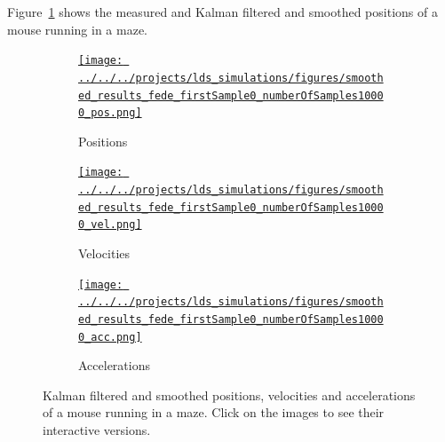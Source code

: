 \documentclass[12pt]{article}
\begin{document}
Figure~\ref{fig:runningMaze} shows the measured and Kalman filtered and smoothed
positions of a mouse running in a maze.

\begin{figure}
    \begin{center}

        \begin{subfigure}{\textwidth}
            \centering
            \href{http://www.gatsby.ucl.ac.uk/~rapela/fwg/lds_repo/inference/figures/smoothed_results_fede_firstSample0_numberOfSamples10000_pos.html}{\texttt{[image: ../../../projects/lds\_simulations/figures/smoothed\_results\_fede\_firstSample0\_numberOfSamples10000\_pos.png]}}
            \caption{Positions}
        \end{subfigure}

        \begin{subfigure}{\textwidth}
            \centering
            \href{http://www.gatsby.ucl.ac.uk/~rapela/fwg/lds_repo/inference/figures/smoothed_results_fede_firstSample0_numberOfSamples10000_vel.html}{\texttt{[image: ../../../projects/lds\_simulations/figures/smoothed\_results\_fede\_firstSample0\_numberOfSamples10000\_vel.png]}}
            \caption{Velocities}
        \end{subfigure}

        \begin{subfigure}{\textwidth}
            \centering
            \href{http://www.gatsby.ucl.ac.uk/~rapela/fwg/lds_repo/inference/figures/smoothed_results_fede_firstSample0_numberOfSamples10000_acc.html}{\texttt{[image: ../../../projects/lds\_simulations/figures/smoothed\_results\_fede\_firstSample0\_numberOfSamples10000\_acc.png]}}
            \caption{Accelerations}
        \end{subfigure}


        \caption{Kalman filtered and smoothed positions, velocities and
        accelerations of a mouse running in a maze. Click on the images to see
        their interactive versions.}

        \label{fig:runningMaze}

    \end{center}
\end{figure}



\end{document}
